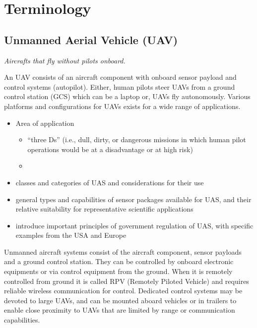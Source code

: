 
\section{Terminology}


\subsection{Unmanned Aerial Vehicle (UAV)} \cite{Watts2012}
\textit{Aircrafts that fly without pilots onboard.}


An UAV consists of an aircraft component with onboard sensor payload and control systems (autopilot).
Either, human pilots steer UAVs from 
a ground control station (GCS) which can be a laptop or, UAVs fly autonomously.
Various platforms and configurations for UAVs exists for a wide range of applications.

\begin{itemize}
    \item Area of application
    \begin{itemize}
        \item “three Ds” (i.e., dull, dirty, or dangerous missions 
        in which human pilot operations would be at a disadvantage or at high risk)
        \item 
    \end{itemize}
    \item classes and categories of UAS and considerations for their use
    \item general types and
    capabilities of sensor packages available for UAS, and their relative suitability for representative
    scientific applications
    \item introduce important principles of government regulation of UAS,
    with specific examples from the USA and Europe
\end{itemize}




Unmanned aircraft systems consist of the aircraft component, 
sensor payloads and a ground control station. 
They can be controlled by onboard electronic equipments or via control equipment from the ground. 
When it is remotely controlled from ground it is called RPV (Remotely Piloted Vehicle) and requires reliable wireless communication for control. Dedicated control systems may be devoted to large UAVs, and can be mounted aboard vehicles or in trailers to enable close proximity to UAVs that are limited by range or communication capabilities.

